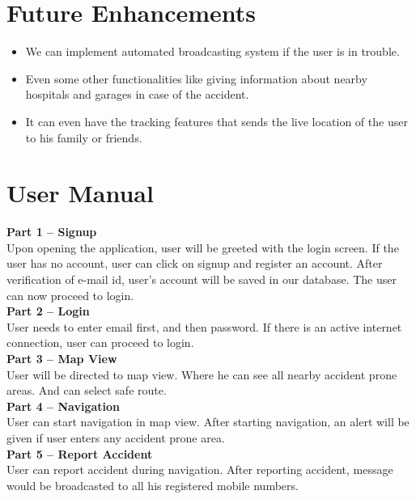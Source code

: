 \documentclass{article}
\begin{document}
\begin{flushleft}
\begin{itemize}
    \end{itemize}
    
    \section{Future Enhancements}
    \begin{itemize}
        \item We can implement automated broadcasting system if the user is in trouble.
        \item Even some other functionalities like giving information about nearby hospitals and garages in case of the accident.
        \item It can even have the tracking features that sends the live location of the user to his family or friends.
    \end{itemize}
    \newpage
    
    \section{User Manual}
        \textbf{Part 1 – Signup }\\
Upon opening the application, user will be greeted with the login screen. If the user has no account,
user can click on signup and register an account. After verification of e-mail id, user’s account will be saved in our database. The user can now proceed
to login.  \\
\newline
\textbf{Part 2 – Login} \\
User needs to enter email first, and then password. If there is an active internet connection, user can proceed to login. \\
\newline
\textbf{Part 3 – Map View} \\
User will be directed to map view. Where he can see all nearby accident prone areas. And can select safe route.
\\
\newline
\textbf{Part 4 – Navigation} \\
User can start navigation in map view. After starting navigation, an alert will be given if user enters any accident prone area. \\
\newline
\textbf{Part 5 – Report Accident} \\
User can report accident during navigation. After reporting accident, message would be broadcasted to all his registered mobile numbers.


\end{flushleft}
\end{document}
